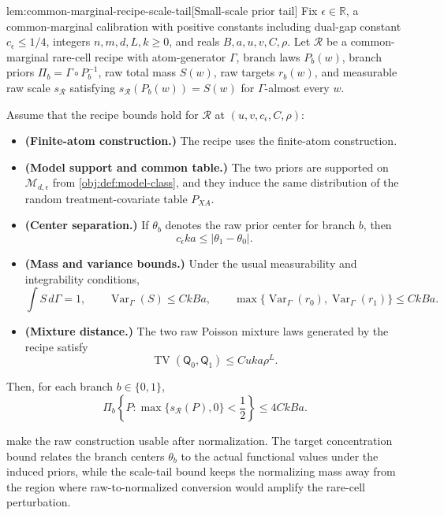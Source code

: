 \begin{lemmav}{lem:common-marginal-recipe-scale-tail}[Small-scale prior tail]
Fix \(\epsilon\in\mathbb R\), a common-marginal calibration with positive constants including dual-gap constant \(c_\epsilon\le 1/4\), integers \(n,m,d,L,k\ge0\), and reals \(B,a,u,v,C,\rho\).  Let \(\mathcal R\) be a common-marginal rare-cell recipe with atom-generator \(\Gamma\), branch laws \(P_b(w)\), branch priors \(\Pi_b=\Gamma\circ P_b^{-1}\), raw total mass \(S(w)\), raw targets \(r_b(w)\), and measurable raw scale \(s_{\mathcal R}\) satisfying \(s_{\mathcal R}(P_b(w))=S(w)\) for \(\Gamma\)-almost every \(w\).

Assume that the recipe bounds hold for \(\mathcal R\) at \((u,v,c_\epsilon,C,\rho)\):
\begin{itemize}
\item \textbf{(Finite-atom construction.)} The recipe uses the finite-atom construction.
\item \textbf{(Model support and common table.)} The two priors are supported on \(\mathcal M_{d,\epsilon}\) from \cref{obj:def:model-class}, and they induce the same distribution of the random treatment-covariate table \(P_{XA}\).
\item \textbf{(Center separation.)} If \(\theta_b\) denotes the raw prior center for branch \(b\), then
\[
c_\epsilon k a \le |\theta_1-\theta_0|.
\]
\item \textbf{(Mass and variance bounds.)} Under the usual measurability and integrability conditions,
\[
\int S\,d\Gamma=1,\qquad
\operatorname{Var}_{\Gamma}(S)\le CkBa,\qquad
\max\{\operatorname{Var}_{\Gamma}(r_0),\operatorname{Var}_{\Gamma}(r_1)\}\le CkBa.
\]
\item \textbf{(Mixture distance.)} The two raw Poisson mixture laws generated by the recipe satisfy
\[
\operatorname{TV}(\mathsf Q_0,\mathsf Q_1)\le Cuka\rho^L.
\]
\end{itemize}
Then, for each branch \(b\in\{0,1\}\),
\[
\Pi_b\!\left\{P:\max\{s_{\mathcal R}(P),0\}<\frac12\right\}
\le 4CkBa .
\]
\end{lemmav}

 make the raw construction usable after normalization. The target concentration bound relates the branch centers \(\theta_b\) to the actual functional values under the induced priors, while the scale-tail bound keeps the normalizing mass away from the region where raw-to-normalized conversion would amplify the rare-cell perturbation.

